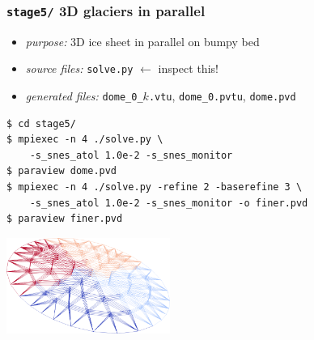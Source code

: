 \documentclass[10pt,
               hyperref={colorlinks,citecolor=DeepPink4,linkcolor=black,urlcolor=blue},
               svgnames]{beamer}
\begin{document}
\begin{frame}[fragile]
\frametitle{\texttt{stage5/} \qquad 3D glaciers in parallel}

\begin{itemize}
\item \emph{purpose:} 3D ice sheet in parallel on bumpy bed
\item \emph{source files:} \texttt{solve.py} \hfill \alert{$\gets$ inspect this!}
\item \emph{generated files:} \texttt{dome\_0\_}$k$\texttt{.vtu}, \texttt{dome\_0.pvtu}, \texttt{dome.pvd}
\end{itemize}

\bigskip
\begin{Verbatim}
$ cd stage5/
$ mpiexec -n 4 ./solve.py \
    -s_snes_atol 1.0e-2 -s_snes_monitor
$ paraview dome.pvd
$ mpiexec -n 4 ./solve.py -refine 2 -baserefine 3 \
    -s_snes_atol 1.0e-2 -s_snes_monitor -o finer.pvd
$ paraview finer.pvd
\end{Verbatim}

\bigskip
\begin{center}
\includegraphics[width=0.4\textwidth]{figs/stage5.png}
\end{center}
\end{frame}
\end{document}
